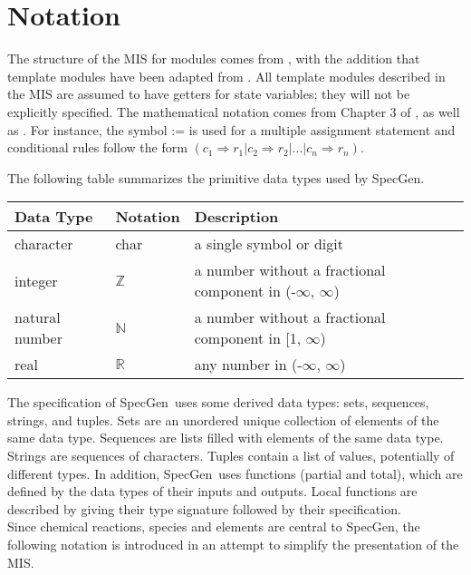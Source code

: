 \documentclass[12pt, titlepage]{article}
\newcommand{\progname}{SpecGen}
\begin{document}
\section{Notation}

The structure of the MIS for modules comes from \citet{HoffmanAndStrooper1995},
with the addition that template modules have been adapted from
\cite{GhezziEtAl2003}.  All template modules described in the MIS are assumed to
have getters for state variables; they will not be explicitly specified.
 The mathematical notation comes from Chapter 3 of
\citet{HoffmanAndStrooper1995}, as well as \cite{GS1993}.  For instance, the
symbol := is used for a multiple assignment statement and conditional rules
follow the form
$(c_1 \Rightarrow r_1 | c_2 \Rightarrow r_2 | ... | c_n \Rightarrow r_n )$.

The following table summarizes the primitive data types used by \progname. 

\begin{center}
\renewcommand{\arraystretch}{1.2}
\noindent 
\begin{tabular}{l l p{7.5cm}} 
\toprule 
\textbf{Data Type} & \textbf{Notation} & \textbf{Description}\\ 
\midrule
character & char & a single symbol or digit\\
integer & $\mathbb{Z}$ & a number without a fractional component in (-$\infty$, $\infty$) \\
natural number & $\mathbb{N}$ & a number without a fractional component in [1, $\infty$) \\
real & $\mathbb{R}$ & any number in (-$\infty$, $\infty$)\\
\bottomrule
\end{tabular} 
\end{center}

\noindent
The specification of \progname \ uses some derived data types: sets, sequences, strings, and
tuples. Sets are an unordered unique collection of elements of the same data type.  
Sequences are lists filled with elements of the same data type. Strings
are sequences of characters. Tuples contain a list of values, potentially of
different types. In addition, \progname \ uses functions (partial and total), which
are defined by the data types of their inputs and outputs. Local functions are
described by giving their type signature followed by their specification.\\

\noindent
Since chemical reactions, species and elements are central to \progname{}, the following 
notation is introduced in an attempt to simplify the presentation of the MIS.\\
\end{document}
